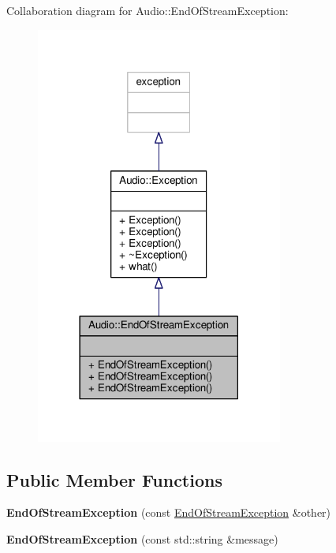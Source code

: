 Collaboration diagram for Audio\+:\+:End\+Of\+Stream\+Exception\+:
\nopagebreak
\begin{figure}[H]
\begin{center}
\leavevmode
\includegraphics[width=230pt]{d7/d8c/classAudio_1_1EndOfStreamException__coll__graph}
\end{center}
\end{figure}
\subsection*{Public Member Functions}
\begin{DoxyCompactItemize}
\item 
{\bfseries End\+Of\+Stream\+Exception} (const \hyperlink{classAudio_1_1EndOfStreamException}{End\+Of\+Stream\+Exception} \&other)\hypertarget{classAudio_1_1EndOfStreamException_ab312fed43402b5bac04ac4683a0943eb}{}\label{classAudio_1_1EndOfStreamException_ab312fed43402b5bac04ac4683a0943eb}

\item 
{\bfseries End\+Of\+Stream\+Exception} (const std\+::string \&message)\hypertarget{classAudio_1_1EndOfStreamException_abfca22c940ee821ecb1c9ba0a17243ee}{}\label{classAudio_1_1EndOfStreamException_abfca22c940ee821ecb1c9ba0a17243ee}

\end{DoxyCompactItemize}


